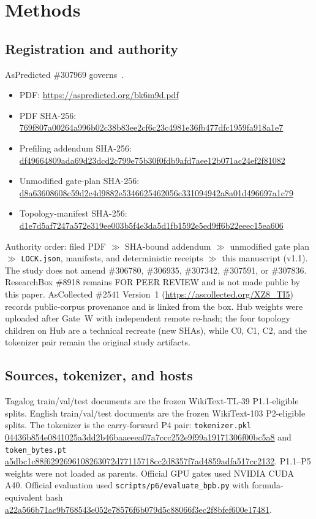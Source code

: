 \documentclass[11pt,a4paper]{article}
\newcommand{\sha}[1]{{\footnotesize\ttfamily\url{#1}}}
\begin{document}
\section{Methods}
\label{sec:methods}

\subsection{Registration and authority}
AsPredicted \#307969 governs~\cite{aspredicted307969}.
\begin{itemize}[leftmargin=1.6em,itemsep=0.35em]
\item PDF: \url{https://aspredicted.org/bk6m9d.pdf}
\item PDF SHA-256:\\
\sha{769f807a00264a996b02c38b83ee2cf6c23c4981e36fb477dfc1959fa918a1e7}
\item Prefiling addendum SHA-256:\\
\sha{df49664809ada69d23dcd2c799e75b30f0fdb9afd7aee12b071ac24ef2f81082}
\item Unmodified gate-plan SHA-256:\\
\sha{d8a63608608c59d2c4d9882e5346625462056c331094942a8a01d496697a1c79}
\item Topology-manifest SHA-256:\\
\sha{d1e7d5af7247a572e319ee003b5f4e3da5d1fb1592e5ed9ff6b22eeec15ea606}
\end{itemize}
Authority order: filed PDF $\gg$ SHA-bound addendum $\gg$ unmodified gate plan $\gg$ \texttt{LOCK.json}, manifests, and deterministic receipts $\gg$ this manuscript (v1.1). The study does not amend \#306780, \#306935, \#307342, \#307591, or \#307836. ResearchBox \#8918 remains FOR PEER REVIEW and is not made public by this paper. AsCollected \#2541 Version~1 (\url{https://ascollected.org/XZ8_TI5}) records public-corpus provenance and is linked from the box. Hub weights were uploaded after Gate~W with independent remote re-hash; the four topology children on Hub are a technical recreate (new SHAs), while C0, C1, C2, and the tokenizer pair remain the original study artifacts.

\subsection{Sources, tokenizer, and hosts}
Tagalog train/val/test documents are the frozen WikiText-TL-39 P1.1-eligible splits. English train/val/test documents are the frozen WikiText-103 P2-eligible splits. The tokenizer is the carry-forward P4 pair: \texttt{tokenizer.pkl} \sha{04436b854e0841025a3dd2b46baaeeea07a7ccc252e9f99a19171306f00bc5a8} and \texttt{token\_bytes.pt} \sha{a5dbc1c88f6292696108263072d77115718cc2d8357f7ad4859adfa517cc2132}. P1.1--P5 weights were not loaded as parents. Official GPU gates used NVIDIA CUDA A40. Official evaluation used \texttt{scripts/p6/evaluate\_bpb.py} with formula-equivalent hash \sha{a22a566b71ac9b768543e052e78576f6b079d5c88066f3ec2f8bfef600e17481}.
\end{document}

